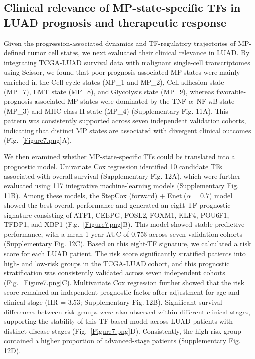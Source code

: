 \documentclass[pdflatex,sn-mathphys-num]{sn-jnl}%
\theoremstyle{thmstyleone}%
\theoremstyle{thmstyletwo}%
\theoremstyle{thmstylethree}%
\begin{document}
\subsection{Clinical relevance of MP-state-specific TFs in LUAD prognosis and therapeutic response}\label{subsec7}

Given the progression-associated dynamics and TF-regulatory trajectories of MP-defined tumor cell states, we next evaluated their clinical relevance in LUAD. By integrating TCGA-LUAD survival data with malignant single-cell transcriptomes using Scissor, we found that poor-prognosis-associated MP states were mainly enriched in the Cell-cycle states (MP\_1 and MP\_2), Cell adhesion state (MP\_7), EMT state (MP\_8), and Glycolysis state (MP\_9), whereas favorable-prognosis-associated MP states were dominated by the TNF-$\alpha$--NF-$\kappa$B state (MP\_3) and MHC class II state (MP\_4) (Supplementary Fig. 11A). This pattern was consistently supported across seven independent validation cohorts, indicating that distinct MP states are associated with divergent clinical outcomes (Fig.~\ref{Figure7.png}A).

We then examined whether MP-state-specific TFs could be translated into a prognostic model. Univariate Cox regression identified 10 candidate TFs associated with overall survival (Supplementary Fig. 12A), which were further evaluated using 117 integrative machine-learning models (Supplementary Fig. 11B). Among these models, the StepCox (forward) + Enet ($\alpha = 0.7$) model showed the best overall performance and generated an eight-TF prognostic signature consisting of ATF1, CEBPG, FOSL2, FOXM1, KLF4, POU6F1, TFDP1, and XBP1 (Fig.~\ref{Figure7.png}B). This model showed stable predictive performance, with a mean 1-year AUC of 0.758 across seven validation cohorts (Supplementary Fig. 12C).
Based on this eight-TF signature, we calculated a risk score for each LUAD patient. The risk score significantly stratified patients into high- and low-risk groups in the TCGA-LUAD cohort, and this prognostic stratification was consistently validated across seven independent cohorts (Fig.~\ref{Figure7.png}C). Multivariate Cox regression further showed that the risk score remained an independent prognostic factor after adjustment for age and clinical stage (HR = 3.53; Supplementary Fig. 12B). Significant survival differences between risk groups were also observed within different clinical stages, supporting the stability of this TF-based model across LUAD patients with distinct disease stages (Fig.~\ref{Figure7.png}D). Consistently, the high-risk group contained a higher proportion of advanced-stage patients (Supplementary Fig. 12D).
\end{document}
